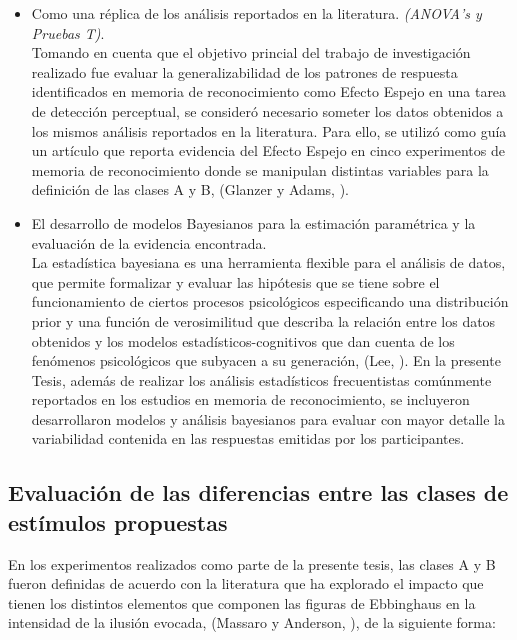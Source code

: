 \begin{itemize}
\item Como una réplica de los análisis reportados en la literatura. \textit{(ANOVA's y Pruebas T)}.\\

Tomando en cuenta que el objetivo princial del trabajo de investigación realizado fue evaluar la generalizabilidad de los patrones de respuesta identificados en memoria de reconocimiento como Efecto Espejo en una tarea de detección perceptual, se consideró necesario someter los datos obtenidos a los mismos análisis reportados en la literatura. Para ello, se utilizó como guía un artículo que reporta evidencia del Efecto Espejo en cinco experimentos de memoria de reconocimiento donde se manipulan distintas variables para la definición de las clases A y B, (Glanzer y Adams, \citeyear{Glanzer1990}).\\

\item El desarrollo de modelos Bayesianos para la estimación paramétrica y la evaluación de la evidencia encontrada.\\

La estadística bayesiana es una herramienta flexible para el análisis de datos, que permite formalizar y evaluar las hipótesis que se tiene sobre el funcionamiento de ciertos procesos psicológicos especificando una distribución prior y una función de verosimilitud que describa la relación entre los datos obtenidos y los modelos estadísticos-cognitivos que dan cuenta de los fenómenos psicológicos que subyacen a su generación, (Lee, \citeyear{Lee2011}). En la presente Tesis, además de realizar los análisis estadísticos frecuentistas comúnmente reportados en los estudios en memoria de reconocimiento, se incluyeron desarrollaron modelos y análisis bayesianos para evaluar con mayor detalle la variabilidad contenida en las respuestas emitidas por los participantes.\\
\end{itemize}










\subsection{Evaluación de las diferencias entre las clases de estímulos propuestas}

En los experimentos realizados como parte de la presente tesis, las clases A y B fueron definidas de acuerdo con la literatura que ha explorado el impacto que tienen los distintos elementos que componen las figuras de Ebbinghaus en la intensidad de la ilusión evocada, (Massaro y Anderson, \citeyear{Massaro1971}), de la siguiente forma: \\

